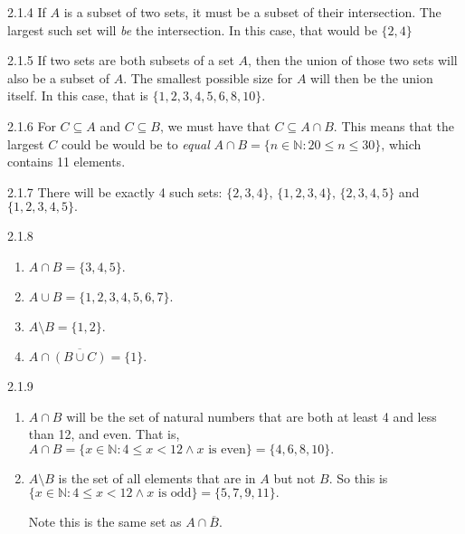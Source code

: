 \documentclass[11pt,]{book}
\theoremstyle{ptxplainnotitle}
\theoremstyle{ptxplaintitle}
\theoremstyle{ptxdefinitionnotitle}
\theoremstyle{ptxdefinitiontitle}
\theoremstyle{ptxdefinitionnotitle}
\theoremstyle{ptxdefinitiontitle}
\theoremstyle{ptxdefinitionnotitle}
\theoremstyle{ptxdefinitiontitle}
\theoremstyle{ptxdefinitiontitlenonumber}
\theoremstyle{ptxdefinitiontitlenonumber}
\numberwithin{equation}{chapter}
\newcommand{\N}{\mathbb N}
\newcommand{\st}{:}
\renewcommand{\bar}{\overline}
\newcommand{\lt}{<}
\begin{document}
\begin{divisionexercise}{2.1.4}
\textbf{}\hypertarget{p-852}{}%
If \(A\) is a subset of two sets, it must be a subset of their intersection.  The largest such set will \emph{be} the intersection.  In this case, that would be \(\{2,4\}\)%
\end{divisionexercise}%
\begin{divisionexercise}{2.1.5}
\textbf{}\hypertarget{p-858}{}%
If two sets are both subsets of a set \(A\text{,}\) then the union of those two sets will also be a subset of \(A\text{.}\)  The smallest possible size for \(A\) will then be the union itself. In this case, that is \(\{1,2,3,4,5,6,8,10\}\text{.}\)%
\end{divisionexercise}%
\begin{divisionexercise}{2.1.6}
\textbf{}\hypertarget{p-862}{}%
For \(C \subseteq A\) and \(C \subseteq B\text{,}\) we must have that \(C \subseteq A \cap B\text{.}\)  This means that the largest \(C\) could be would be to \emph{equal} \(A \cap B = \{n \in \N \st 20 \le n \le 30\}\text{,}\) which contains 11 elements.%
\end{divisionexercise}%
\begin{divisionexercise}{2.1.7}
\textbf{}\hypertarget{p-870}{}%
There will be exactly 4 such sets: \(\{2, 3, 4\}\text{,}\) \(\{1,2,3,4\}\text{,}\) \(\{2,3,4,5\}\) and \(\{1,2,3,4,5\}\text{.}\)%
\end{divisionexercise}%
\begin{divisionexercise}{2.1.8}
\textbf{}\hypertarget{p-890}{}%
\leavevmode%
\begin{enumerate}[label=(\alph*)]
\item\hypertarget{li-389}{}\hypertarget{p-891}{}%
\(A \cap B = \{3,4,5\}\text{.}\)%
\item\hypertarget{li-390}{}\hypertarget{p-892}{}%
\(A \cup B = \{1,2,3,4,5,6,7\}\text{.}\)%
\item\hypertarget{li-391}{}\hypertarget{p-893}{}%
\(A \setminus B = \{1,2\}\text{.}\)%
\item\hypertarget{li-392}{}\hypertarget{p-894}{}%
\(A \cap \bar{(B \cup C)} = \{1\}\text{.}\)%
\end{enumerate}
%
\end{divisionexercise}%
\begin{divisionexercise}{2.1.9}
\textbf{}\hypertarget{p-909}{}%
\leavevmode%
\begin{enumerate}[label=(\alph*)]
\item\hypertarget{li-399}{}\hypertarget{p-910}{}%
\(A \cap B\) will be the set of natural numbers that are both at least 4 and less than 12, and even.  That is, \(A \cap B = \{x \in \N \st 4\le x \lt 12 \wedge x \text{ is even}\} = \{4, 6, 8, 10\}\text{.}\)%
\item\hypertarget{li-400}{}\hypertarget{p-911}{}%
\(A \setminus B\) is the set of all elements that are in \(A\) but not \(B\text{.}\)  So this is \(\{x \in \N \st 4 \le x \lt 12 \wedge x \text{ is odd}\} = \{5,7,9,11\}\text{.}\)%
\par
\hypertarget{p-912}{}%
Note this is the same set as \(A \cap \bar{B}\text{.}\)%
\end{enumerate}
%
\end{divisionexercise}%
\end{document}
